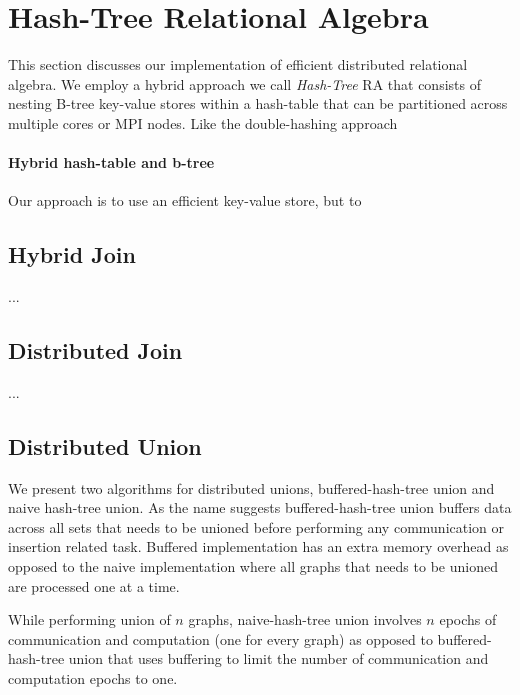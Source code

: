 

\section{Hash-Tree Relational Algebra}
\label{sec:impl}
%
This section discusses our implementation of efficient distributed relational algebra. We employ a hybrid approach we call \emph{Hash-Tree} RA that consists of nesting B-tree key-value stores within a hash-table that can be partitioned across multiple cores or MPI nodes. Like the double-hashing approach 



\paragraph{Hybrid hash-table and b-tree} Our approach is to use an efficient key-value store, but to



\subsection{Hybrid Join}

...

\subsection{Distributed Join}

...


\subsection{Distributed Union}
We present two algorithms for distributed unions, buffered-hash-tree union and naive hash-tree union. As the name suggests buffered-hash-tree union buffers data across all sets that needs to be unioned before performing any communication or insertion related task. Buffered implementation has an extra memory overhead as opposed to the naive implementation where all graphs that needs to be unioned are processed one at a time.

While performing union of $n$ graphs, naive-hash-tree union involves $n$ epochs of communication and computation (one for every graph) as opposed to buffered-hash-tree union that uses buffering to limit the number of communication and computation epochs to one. 

